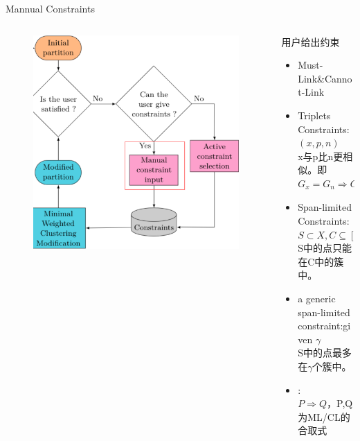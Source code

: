 \documentclass{beamer}
\begin{document}
\begin{frame}{Mannual Constraints}
    \begin{columns}
        \begin{column}{0.3\textwidth}
            \begin{figure}[htpb]
                \begin{center}
                    \includegraphics[width=\linewidth]{./images/constraint.png}
                \end{center}
            \end{figure}
        \end{column}     
        \begin{column}{0.6\textwidth}
            用户给出约束

            \begin{itemize}
                \item Must-Link\&Cannot-Link
                \item Triplets Constraints:$(x,p,n)$\\ x与p比n更相似。即$G_x=G_n\Rightarrow G_x=G_p$
                \item Span-limited Constraints:$S\subset X,C\subseteq [1,K]$\\
                S中的点只能在C中的簇中。
                \item a generic span-limited constraint:given $\gamma$\\
                S中的点最多在$\gamma$个簇中。
                \item {}:\\
                $P\Rightarrow Q$，P,Q为ML/CL的合取式
            \end{itemize}
        \end{column}
    \end{columns}


\end{frame}
\end{document}
